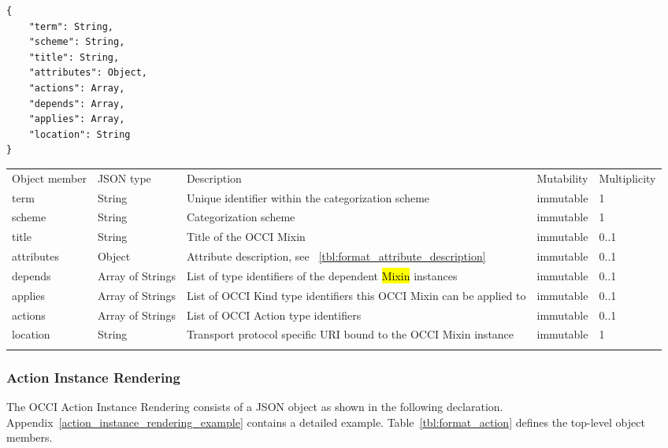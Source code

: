 \documentclass[10pt,a4paper]{article}
\begin{document}
\begin{lstlisting}
{
    "term": String,
    "scheme": String,
    "title": String,
    "attributes": Object,
    "actions": Array,
    "depends": Array,
    "applies": Array,
    "location": String
}
\end{lstlisting}

 {
    \begin{tabularx}{\textwidth}{llXll}
    \toprule
    Object member & JSON type & Description & Mutability & Multiplicity \\
    \colrule
    term & String & Unique identifier within the categorization scheme &
immutable & 1 \\

    scheme & String & Categorization scheme & immutable & 1 \\

    title & String & Title of the OCCI Mixin & immutable & 0..1 \\

    attributes & Object & Attribute description, see
~\ref{tbl:format_attribute_description} & immutable & 0..1 \\

    depends & Array of Strings & List of type identifiers of the dependent
 \hl{Mixin} instances & immutable & 0..1 \\

    applies & Array of Strings & List of OCCI Kind type identifiers this OCCI
Mixin can be applied to & immutable & 0..1 \\

    actions & Array of Strings & List of OCCI Action type identifiers
& immutable & 0..1 \\

    location & String & Transport protocol specific URI bound to the OCCI Mixin
instance & immutable & 1 \\
    \botrule
    \end{tabularx}
}

\subsubsection{Action Instance Rendering}
\label{sec:format_action}

The OCCI Action Instance Rendering consists of a JSON object as shown in the
following declaration. Appendix~\ref{action_instance_rendering_example} contains a detailed example.
Table~\ref{tbl:format_action} defines the top-level object members.
\end{document}
